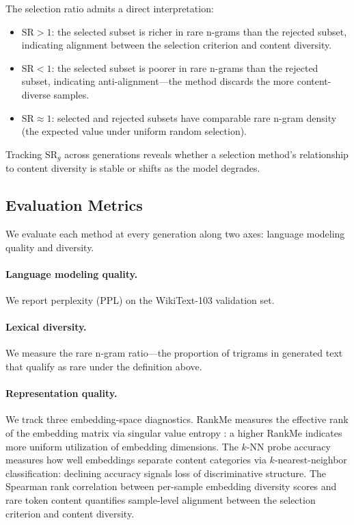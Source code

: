 The selection ratio admits a direct interpretation:
\begin{itemize}
    \item $\text{SR} > 1$: the selected subset is richer in rare n-grams than the rejected subset, indicating alignment between the selection criterion and content diversity.
    \item $\text{SR} < 1$: the selected subset is poorer in rare n-grams than the rejected subset, indicating anti-alignment---the method discards the more content-diverse samples.
    \item $\text{SR} \approx 1$: selected and rejected subsets have comparable rare n-gram density (the expected value under uniform random selection).
\end{itemize}

\noindent Tracking $\text{SR}_g$ across generations reveals whether a selection method's relationship to content diversity is stable or shifts as the model degrades.

\subsection{Evaluation Metrics}

We evaluate each method at every generation along two axes: language modeling quality and diversity.

\paragraph{Language modeling quality.} We report perplexity (PPL) on the WikiText-103 validation set.

\paragraph{Lexical diversity.} We measure the rare n-gram ratio---the proportion of trigrams in generated text that qualify as rare under the definition above.

\paragraph{Representation quality.} We track three embedding-space diagnostics. RankMe measures the effective rank of the embedding matrix via singular value entropy \citep{garrido2023rankme}: a higher RankMe indicates more uniform utilization of embedding dimensions. The $k$-NN probe accuracy measures how well embeddings separate content categories via $k$-nearest-neighbor classification: declining accuracy signals loss of discriminative structure. The Spearman rank correlation between per-sample embedding diversity scores and rare token content quantifies sample-level alignment between the selection criterion and content diversity.

